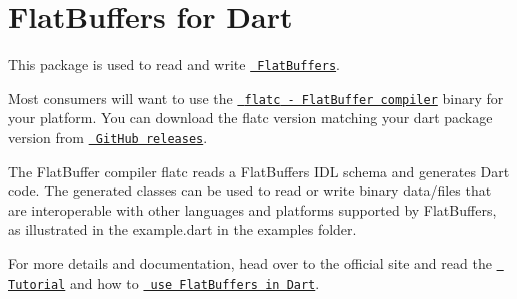 \chapter{Flat\+Buffers for Dart}
\hypertarget{md_flatbuffers_2dart_2README}{}\label{md_flatbuffers_2dart_2README}
This package is used to read and write \href{https://google.github.io/flatbuffers/}{\texttt{ Flat\+Buffers}}.

Most consumers will want to use the \href{https://github.com/google/flatbuffers}{\texttt{ {\ttfamily flatc} -\/ Flat\+Buffer compiler}} binary for your platform. You can download the flatc version matching your dart package version from \href{https://github.com/google/flatbuffers/releases}{\texttt{ Git\+Hub releases}}.

The Flat\+Buffer compiler {\ttfamily flatc} reads a Flat\+Buffers IDL schema and generates Dart code. The generated classes can be used to read or write binary data/files that are interoperable with other languages and platforms supported by Flat\+Buffers, as illustrated in the {\ttfamily example.\+dart} in the examples folder.

For more details and documentation, head over to the official site and read the \href{https://google.github.io/flatbuffers/flatbuffers_guide_tutorial.html}{\texttt{ Tutorial}} and how to \href{https://google.github.io/flatbuffers/flatbuffers_guide_use_dart.html}{\texttt{ use Flat\+Buffers in Dart}}. 